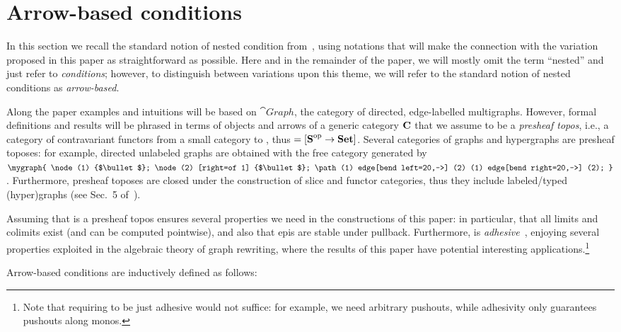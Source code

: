 \section{Arrow-based conditions}

In this section we recall the standard notion of nested condition from~\cite{Rensink-FOL}, using notations that will make the connection with the variation proposed in this paper as straightforward as possible. Here and in the remainder of the paper, we will mostly omit the term ``nested'' and just refer to \emph{conditions}; however, to distinguish between variations upon this theme, we will refer to the standard notion of nested conditions as \emph{arrow-based}.

Along the paper examples and intuitions will be based on $\cat{Graph}$, the category of directed, edge-labelled multigraphs. However, formal definitions and results will be phrased in terms of objects and arrows of a generic category $\mathbf{C}$ that we assume to be a \emph{presheaf topos}, i.e., a category of contravariant functors from a small category  to , thus  $= [\mbox{\textbf{S}}^{\mathrm{op}} \rightarrow \textbf{Set}]$. Several categories of graphs and hypergraphs are presheaf toposes: for example, directed unlabeled graphs are obtained with  the free category generated by $\mygraph{
  \node (1) {$\bullet$};
  \node (2) [right=of 1] {$\bullet$};
  \path (1) edge[bend left=20,->] (2)
        (1) edge[bend right=20,->] (2);
}$. Furthermore, presheaf toposes are closed under the construction of slice and functor categories, thus they include labeled/typed (hyper)graphs (see Sec.~5 of~\cite{AzziCR19}). 

Assuming that  is a presheaf topos ensures several properties we need in the constructions of this paper: in particular, that all limits and colimits exist (and can be computed pointwise), and also that epis are stable under pullback. Furthermore,  is \emph{adhesive}~\cite{ls:adhesive-journal}, enjoying several properties exploited in the algebraic theory of graph rewriting, where the results of this paper have potential interesting applications.\footnote{Note that requiring  to be just adhesive would not suffice: for example, we need arbitrary pushouts, while adhesivity only guarantees pushouts along monos.}

\medskip\noindent
Arrow-based conditions are inductively defined as follows:

